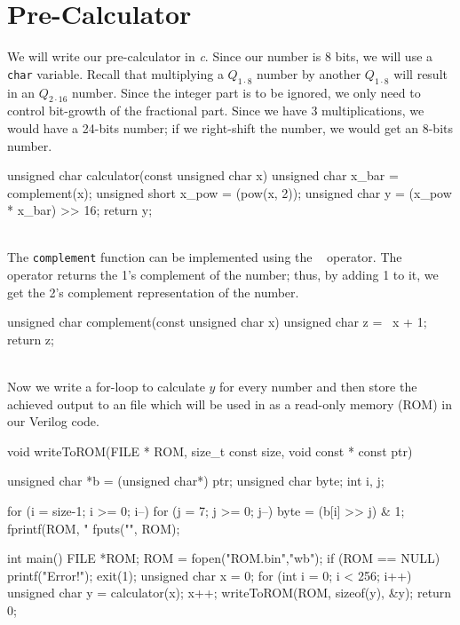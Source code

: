 \documentclass{article}
\let\oldsection\section
\renewcommand{\section}{%
    \setcounter{subsection}{0}%
    \oldsection%
}
\begin{document}
    \section{Pre-Calculator}
    We will write our pre-calculator in \textsl{c}. Since our number is $ 8 $ bits, we will use a \texttt{char} variable. Recall that multiplying a $ Q_{1 \cdot 8}$ number by another $ Q_{1 \cdot 8}$ will result in an $ Q_{2 \cdot 16}$ number. Since the integer part is to be ignored, we only need to control bit-growth of the fractional part. Since we have 3 multiplications, we would have a 24-bits number; if we right-shift the number, we would get an 8-bits number.
\begin{ccode}
unsigned char calculator(const unsigned char x) 
{
    unsigned char x_bar = complement(x);
    unsigned short x_pow = (pow(x, 2));
    unsigned char y = (x_pow * x_bar) >> 16;
    return y;
}
\end{ccode}
    ~\\ The \texttt{complement} function can be implemented using the \texttt{~} operator. The \texttt{~} operator returns the 1's complement of the number; thus, by adding 1 to it, we get the 2's complement representation of the number.
\begin{ccode}
unsigned char complement(const unsigned char x) 
{
    unsigned char z = ~x + 1;
    return z;
}
\end{ccode}

~\\Now we write a for-loop to calculate $ y $ for every number and then store the achieved output to an file which will be used in as a read-only memory (ROM) in our Verilog code.
\begin{ccode}
void writeToROM(FILE * ROM, size_t const size, void const * const ptr)
{
    unsigned char *b = (unsigned char*) ptr;
    unsigned char byte;
    int i, j;
    
    for (i = size-1; i >= 0; i--) {
        for (j = 7; j >= 0; j--) {
            byte = (b[i] >> j) & 1;
            fprintf(ROM, "%
        }
    }
    fputs("\n", ROM);
}

int main() 
{
    FILE *ROM;
    ROM = fopen("ROM.bin","wb");
    if (ROM == NULL) {
        printf("Error!");   
        exit(1);
    }
    unsigned char x = 0; 
    for (int i = 0; i < 256; i++) {
        unsigned char y = calculator(x);
        x++;
        writeToROM(ROM, sizeof(y), &y);
    }
    return 0;
}
\end{ccode}
\end{document}
